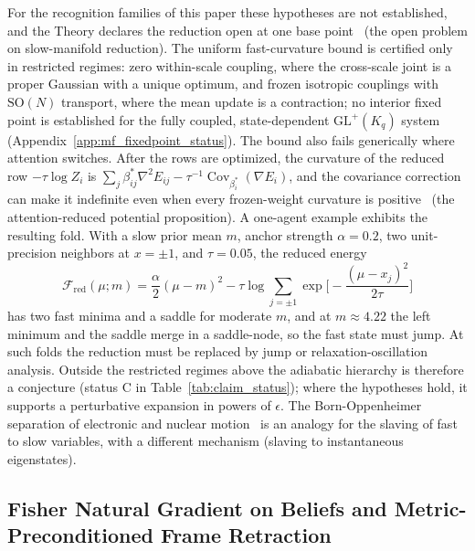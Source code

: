 For the recognition families of this paper these hypotheses are not established, and the Theory declares the reduction open at one base point~\cite[Ch.~8]{DennisGaugeVFE2026} (the open problem on slow-manifold reduction). The uniform fast-curvature bound is certified only in restricted regimes: zero within-scale coupling, where the cross-scale joint is a proper Gaussian with a unique optimum, and frozen isotropic couplings with $\mathrm{SO}(N)$ transport, where the mean update is a contraction; no interior fixed point is established for the fully coupled, state-dependent $\mathrm{GL}^+(K_q)$ system (Appendix~\ref{app:mf_fixedpoint_status}). The bound also fails generically where attention switches. After the rows are optimized, the curvature of the reduced row $-\tau\log Z_i$ is $\sum_j\beta^*_{ij}\nabla^2E_{ij} - \tau^{-1}\operatorname{Cov}_{\beta_i^*}(\nabla E_i)$, and the covariance correction can make it indefinite even when every frozen-weight curvature is positive~\cite[Ch.~6]{DennisGaugeVFE2026} (the attention-reduced potential proposition). A one-agent example exhibits the resulting fold. With a slow prior mean $m$, anchor strength $\alpha = 0.2$, two unit-precision neighbors at $x = \pm 1$, and $\tau = 0.05$, the reduced energy
\begin{equation}
\mathcal{F}_{\mathrm{red}}(\mu; m) = \frac{\alpha}{2}(\mu - m)^2 - \tau\log\sum_{j=\pm1}\exp\Big[-\frac{(\mu - x_j)^2}{2\tau}\Big]
\end{equation}
has two fast minima and a saddle for moderate $m$, and at $m \approx 4.22$ the left minimum and the saddle merge in a saddle-node, so the fast state must jump. At such folds the reduction must be replaced by jump or relaxation-oscillation analysis. Outside the restricted regimes above the adiabatic hierarchy is therefore a conjecture (status C in Table~\ref{tab:claim_status}); where the hypotheses hold, it supports a perturbative expansion in powers of $\epsilon$. The Born-Oppenheimer separation of electronic and nuclear motion~\cite{Born1927} is an analogy for the slaving of fast to slow variables, with a different mechanism (slaving to instantaneous eigenstates).

\subsection{Fisher Natural Gradient on Beliefs and Metric-Preconditioned Frame Retraction}

